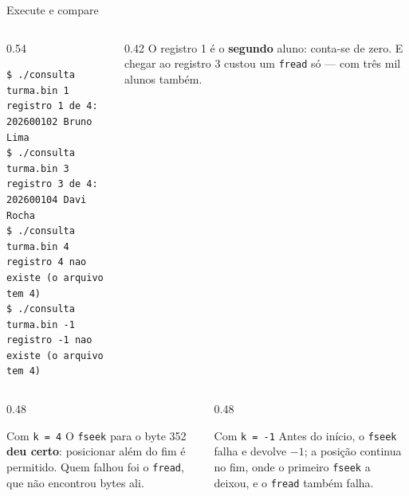 \documentclass[aspectratio=169]{beamer}
\begin{document}
\begin{frame}[fragile]{Execute e compare}
  \begin{columns}[T]
    \begin{column}{0.54\textwidth}
\begin{lstlisting}[style=shellS]
$ ./consulta turma.bin 1
registro 1 de 4: 202600102 Bruno Lima
$ ./consulta turma.bin 3
registro 3 de 4: 202600104 Davi Rocha
$ ./consulta turma.bin 4
registro 4 nao existe (o arquivo tem 4)
$ ./consulta turma.bin -1
registro -1 nao existe (o arquivo tem 4)
\end{lstlisting}
    \end{column}
    \begin{column}{0.42\textwidth}
      \small O registro 1 é o \textbf{segundo} aluno: conta-se de zero. E
      chegar ao registro 3 custou um \texttt{fread} só --- com três mil
      alunos também.
    \end{column}
  \end{columns}
  \medskip
  \begin{columns}[T]
    \begin{column}{0.48\textwidth}
      \begin{block}{Com \texttt{k = 4}}
        \small O \texttt{fseek} para o byte 352 \textbf{deu certo}: posicionar
        além do fim é permitido. Quem falhou foi o \texttt{fread}, que não
        encontrou bytes ali.
      \end{block}
    \end{column}
    \begin{column}{0.48\textwidth}
      \begin{block}{Com \texttt{k = -1}}
        \small Antes do início, o \texttt{fseek} falha e devolve $-1$; a
        posição continua no fim, onde o primeiro \texttt{fseek} a deixou, e
        o \texttt{fread} também falha.
      \end{block}
    \end{column}
  \end{columns}
\end{frame}
\end{document}
